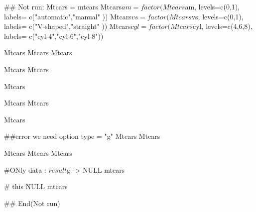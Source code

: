 \documentclass[a4paper]{book}
\begin{document}
\begin{Examples}
\begin{ExampleCode}
\#\# Not run: 
Mtcars = mtcars
Mtcars$am = factor(Mtcars$am, levels=c(0,1), labels= c("automatic","manual" ))
Mtcars$vs  = factor(Mtcars$vs, levels=c(0,1), labels= c("V-shaped","straight" ))
Mtcars$cyl  = factor(Mtcars$cyl, levels=c(4,6,8), labels= c("cyl-4","cyl-6","cyl-8"))

Mtcars %
Mtcars %
Mtcars %

Mtcars %
Mtcars %

Mtcars %

Mtcars %
Mtcars %

Mtcars %

##error we need option  type = "g"
Mtcars %
Mtcars %

Mtcars %
Mtcars %
Mtcars %

#ONly data : $result  $g -> NULL
 mtcars %

# this NULL
mtcars %

## End(Not run)



\end{ExampleCode}
\end{Examples}
\end{document}
